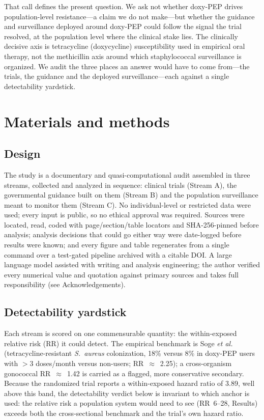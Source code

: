 \documentclass[12pt,a4paper]{article}
\newcommand{\sa}{\emph{S.~aureus}}
\begin{document}
That call defines the present question. We ask not whether doxy-PEP drives
population-level resistance---a claim we do not make---but whether the guidance
and surveillance deployed around doxy-PEP could follow the signal the trial
resolved, at the population level where the clinical stake lies. The clinically
decisive axis is tetracycline (doxycycline) susceptibility used in empirical oral
therapy, not the methicillin axis around which staphylococcal surveillance is
organized. We audit the three places an answer would have to come from---the
trials, the guidance and the deployed surveillance---each against a single
detectability yardstick.

\section*{Materials and methods}

\subsection*{Design}
The study is a documentary and quasi-computational audit assembled in three
streams, collected and analyzed in sequence: clinical trials (Stream A), the
governmental guidance built on them (Stream B) and the population surveillance
meant to monitor them (Stream C). No individual-level or restricted data were
used; every input is public, so no ethical approval was required. Sources were
located, read, coded with page/section/table locators and SHA-256-pinned before
analysis; analysis decisions that could go either way were date-logged before
results were known; and every figure and table regenerates from a single command
over a test-gated pipeline archived with a citable
DOI.\cite{armond2024integrity} A large language model assisted with writing and
analysis engineering; the author verified every numerical value and quotation
against primary sources and takes full responsibility (see Acknowledgements).

\subsection*{Detectability yardstick}
Each stream is scored on one commensurable quantity: the within-exposed relative
risk (RR) it could detect. The empirical benchmark is Soge \textit{et
al.}\cite{soge2025} (tetracycline-resistant \sa{} colonization, 18\% versus 8\%
in doxy-PEP users with $>$3 doses/month versus non-users; RR~$\approx$~2.25); a
cross-organism gonococcal RR~$\approx$~1.42 is carried as a flagged, more
conservative secondary. Because the randomized trial reports a within-exposed
hazard ratio of 3.89, well above this band, the detectability verdict below is
invariant to which anchor is used: the relative risk a population system would
need to see (RR~6--28, Results) exceeds both the cross-sectional benchmark and
the trial's own hazard ratio.
\end{document}
